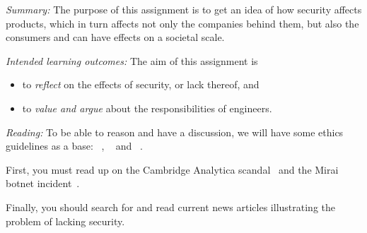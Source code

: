 

\emph{Summary:}
The purpose of this assignment is to get an idea of how security affects 
products, which in turn affects not only the companies behind them, but also 
the consumers and can have effects on a societal scale.

\emph{Intended learning outcomes:}
The aim of this assignment is
\begin{itemize}
\item to \emph{reflect} on the effects of security, or lack thereof, and
\item to \emph{value and argue} about the responsibilities of engineers.
\end{itemize}


\emph{Reading:}
%
To be able to reason and have a discussion, we will have some ethics guidelines 
as a base:
~\cite{acmcode},
~\cite{acmsecode} and
~\cite{ieeecode}.

First, you must read up on the Cambridge Analytica scandal~\cite[\eg][]{%
  wired-cambridge-analytica,
  guardian-cambridge-analytica,
  nytimes-cambridge-analytica,
  wp-cambridge-analytica,
} and the Mirai botnet incident~\cite{schneier-mirai}.

Finally, you should search for and read current news articles illustrating the 
problem of lacking security.
